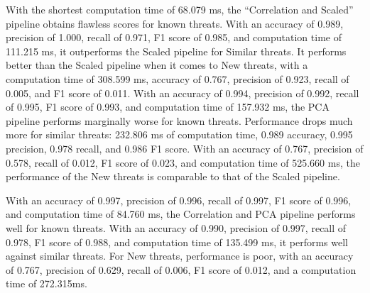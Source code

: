 With the shortest computation time of 68.079 ms, the ``Correlation and Scaled'' pipeline obtains flawless scores for known threats. With an accuracy of 0.989, precision of 1.000, recall of 0.971, F1 score of 0.985, and computation time of 111.215 ms, it outperforms the Scaled pipeline for Similar threats. It performs better than the Scaled pipeline when it comes to New threats, with a computation time of 308.599 ms, accuracy of 0.767, precision of 0.923, recall of 0.005, and F1 score of 0.011. With an accuracy of 0.994, precision of 0.992, recall of 0.995, F1 score of 0.993, and computation time of 157.932 ms, the PCA pipeline performs marginally worse for known threats. Performance drops much more for similar threats: 232.806 ms of computation time, 0.989 accuracy, 0.995 precision, 0.978 recall, and 0.986 F1 score. With an accuracy of 0.767, precision of 0.578, recall of 0.012, F1 score of 0.023, and computation time of 525.660 ms, the performance of the New threats is comparable to that of the Scaled pipeline.


With an accuracy of 0.997, precision of 0.996, recall of 0.997, F1 score of 0.996, and computation time of 84.760 ms, the Correlation and PCA pipeline performs well for known threats. With an accuracy of 0.990, precision of 0.997, recall of 0.978, F1 score of 0.988, and computation time of 135.499 ms, it performs well against similar threats. For New threats, performance is poor, with an accuracy of 0.767, precision of 0.629, recall of 0.006, F1 score of 0.012, and a computation time of 272.315ms. 



